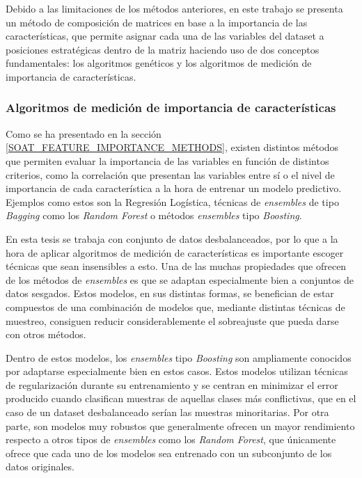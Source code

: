 Debido a las limitaciones de los métodos anteriores, en este trabajo se presenta un método de composición de matrices en base a la importancia de las características, que permite asignar cada una de las variables del dataset a posiciones estratégicas dentro de la matriz haciendo uso de dos conceptos fundamentales: los algoritmos genéticos y los algoritmos de medición de importancia de características.

\subsubsection{Algoritmos de medición de importancia de características}
\label{FEATURE_IMPORTANCE:ALGORITM_JUSTIFICATION}

Como se ha presentado en la sección \ref{SOAT_FEATURE_IMPORTANCE_METHODS}, existen distintos métodos que permiten evaluar la importancia de las variables en función de distintos criterios, como la correlación que presentan las variables entre sí o el nivel de importancia de cada característica a la hora de entrenar un modelo predictivo. Ejemplos como estos son la Regresión Logística, técnicas de \textit{ensembles} de tipo \textit{Bagging} como los \textit{Random Forest} o métodos \textit{ensembles} tipo \textit{Boosting}.

En esta tesis se trabaja con conjunto de datos desbalanceados, por lo que a la hora de aplicar algoritmos de medición de características es importante escoger técnicas que sean insensibles a esto. Una de las muchas propiedades que ofrecen de los métodos de \textit{ensembles} es que se adaptan especialmente bien a conjuntos de datos sesgados. Estos modelos, en sus distintas formas, se benefician de estar compuestos de una combinación de modelos que, mediante distintas técnicas de muestreo, consiguen reducir considerablemente el sobreajuste que pueda darse con otros métodos.

Dentro de estos modelos, los \textit{ensembles} tipo \textit{Boosting} son ampliamente conocidos por adaptarse especialmente bien en estos casos. Estos modelos utilizan técnicas de regularización durante su entrenamiento y se centran en minimizar el error producido cuando clasifican muestras de aquellas clases más conflictivas, que en el caso de un dataset desbalanceado serían las muestras minoritarias. Por otra parte, son modelos muy robustos que generalmente ofrecen un mayor rendimiento respecto a otros tipos de \textit{ensembles} como los \textit{Random Forest}, que únicamente ofrece que cada uno de los modelos sea entrenado con un subconjunto de los datos originales.

